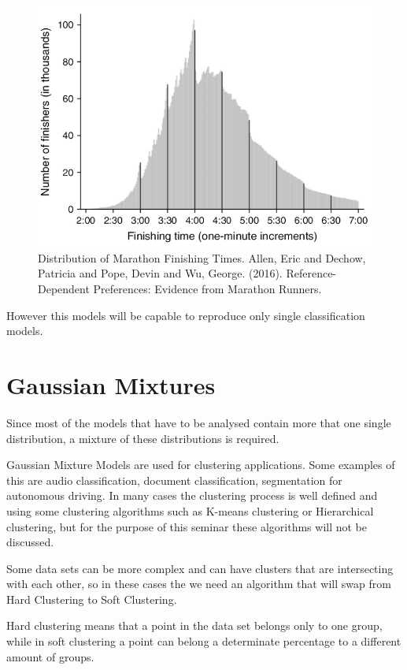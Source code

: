 \documentclass[conference]{IEEEtran}
\begin{document}
\begin{figure}[h]
	\label{fig:race}
	\includegraphics[scale=0.48]{imgs/race.png}
	\caption{Distribution of Marathon Finishing Times. Allen, Eric and Dechow, Patricia and Pope, Devin and Wu, George. (2016). Reference-Dependent Preferences: Evidence from Marathon Runners.}
\end{figure}

However this models will be capable to reproduce only single classification models.

\section{Gaussian Mixtures} \label{gmixtures}

Since most of the models that have to be analysed contain more that one single distribution, a mixture of these distributions is required.

Gaussian Mixture Models are used for clustering applications. Some examples of this are audio classification, document classification, segmentation for autonomous driving. In many cases the clustering process is well defined and using some clustering algorithms such as K-means clustering or Hierarchical clustering, but for the purpose of this seminar these algorithms will not be discussed.

Some data sets can be more complex and can have clusters that are intersecting with each other, so in these cases the we need an algorithm that will swap from Hard Clustering to Soft Clustering.

Hard clustering means that a point in the data set belongs only to one group, while in soft clustering a point can belong a determinate percentage to a different amount of groups.
\end{document}
